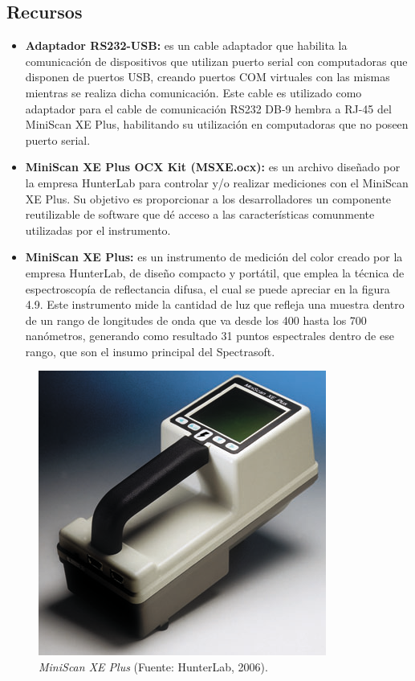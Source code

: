 	\subsection{Recursos}
	
		\begin{itemize}
			
			\item \textbf{Adaptador RS232-USB:} es un cable adaptador que habilita la comunicaci\'{o}n de dispositivos que utilizan puerto serial con computadoras que disponen de puertos USB, creando puertos COM virtuales con las mismas mientras se realiza dicha comunicaci\'{o}n. Este cable es utilizado como adaptador para el cable de comunicaci\'{o}n RS232 DB-9 hembra a RJ-45 del MiniScan XE Plus, habilitando su utilizaci\'{o}n en computadoras que no poseen puerto serial.
			
			\item \textbf{MiniScan XE Plus OCX Kit (MSXE.ocx):} es un archivo dise\~{n}ado por la empresa HunterLab para controlar y/o realizar mediciones con el MiniScan XE Plus. Su objetivo es proporcionar a los desarrolladores un componente reutilizable de software que d\'{e} acceso a las caracter\'{i}sticas comunmente utilizadas por el instrumento.
			
			\item \textbf{MiniScan XE Plus:} es un instrumento de medici\'{o}n del color creado por la empresa HunterLab, de dise\~{n}o compacto y port\'{a}til, que emplea la t\'{e}cnica de espectroscop\'{i}a de reflectancia difusa, el cual se puede apreciar en la figura 4.9. Este instrumento mide la cantidad de luz que refleja una muestra dentro de un rango de longitudes de onda que va desde los 400 hasta los 700 nan\'{o}metros, generando como resultado 31 puntos espectrales dentro de ese rango, que son el insumo principal del Spectrasoft.
			
		\end{itemize}
		
	\begin{figure}[H]
		\centering
		\includegraphics[scale=1]{img/MiniScanXEPlus.png}
			\caption[MiniScan XE Plus]{\textit{MiniScan XE Plus} (Fuente: HunterLab, 2006).}
	\end{figure}
\newpage
